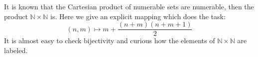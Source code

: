 \documentclass[12pt]{article}
\begin{document}
It is known that the Cartesian product of numerable sets are numerable, then the product $\mathbb{N}\times\mathbb{N}$ is. Here we give an explicit mapping which does the task:
$$(n,m)\mapsto m+\frac{(n+m)(n+m+1)}{2}$$
It is almost easy to check bijectivity and curious how the elements of $\mathbb{N}\times\mathbb{N}$ are labeled.
\end{document}
